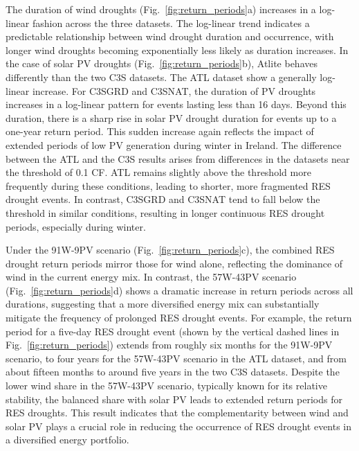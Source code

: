 \documentclass[preprint, 12pt]{elsarticle}
\providecommand{\DIFadd}[1]{{\protect\color{blue}\uwave{#1}}} %
\providecommand{\DIFaddbegin}{} %
\providecommand{\DIFaddend}{} %
\begin{document}
The duration of wind droughts (Fig.~\ref{fig:return_periods}a) increases in a log-linear fashion across the three datasets. The log-linear trend indicates a predictable relationship between wind drought duration and occurrence, with longer wind droughts becoming exponentially less likely as duration increases. In the case of solar PV droughts (Fig.~\ref{fig:return_periods}b), Atlite behaves differently than the two C3S datasets. The ATL dataset show a generally log-linear increase. For C3S\DIFaddbegin \DIFadd{~}\DIFaddend GRD and C3S\DIFaddbegin \DIFadd{~}\DIFaddend NAT, the duration of PV droughts increases in a log-linear pattern for events lasting less than 16 days. Beyond this duration, there is a sharp rise in solar PV drought duration for events up to a one-year return period. This sudden increase again reflects the impact of extended periods of low PV generation during winter in Ireland. The difference between the ATL and the C3S results arises from differences in the datasets near the threshold of 0.1 CF. ATL remains slightly above the threshold more frequently during these conditions, leading to shorter, more fragmented RES drought events. In contrast, C3S\DIFaddbegin \DIFadd{~}\DIFaddend GRD and C3S\DIFaddbegin \DIFadd{~}\DIFaddend NAT tend to fall below the threshold in similar conditions, resulting in longer continuous RES drought periods, especially during winter.

Under the 91W-9PV scenario (Fig.~\ref{fig:return_periods}c), the combined RES drought return periods mirror those for wind alone, reflecting the dominance of wind in the current energy mix. In contrast, the 57W-43PV scenario (Fig.~\ref{fig:return_periods}d) shows a dramatic increase in return periods across all durations, suggesting that a more diversified energy mix can substantially mitigate the frequency of prolonged RES drought events. For example, the return period for a five-day RES drought event (shown by the vertical dashed lines in Fig.~\ref{fig:return_periods}) extends from roughly six months for the 91W-9PV scenario, to four years for the 57W-43PV scenario in the ATL dataset, and from about fifteen months to around five years in the two C3S datasets. Despite the lower wind share in the 57W-43PV scenario, typically known for its relative stability, the balanced share with solar PV leads to extended return periods for RES droughts. This result indicates that the complementarity between wind and solar PV plays a crucial role in reducing the occurrence of RES drought events in a diversified energy portfolio.
\end{document}
